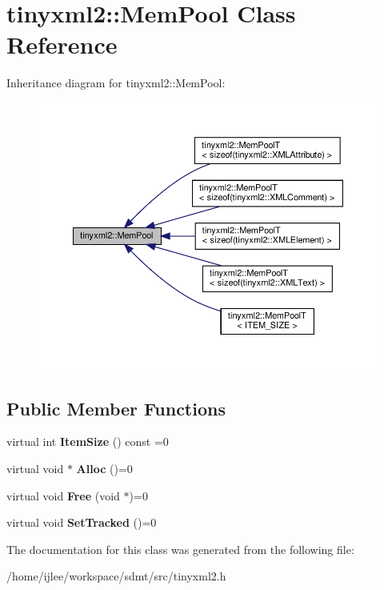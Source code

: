 \hypertarget{classtinyxml2_1_1_mem_pool}{}\section{tinyxml2\+:\+:Mem\+Pool Class Reference}
\label{classtinyxml2_1_1_mem_pool}


Inheritance diagram for tinyxml2\+:\+:Mem\+Pool\+:
\nopagebreak
\begin{figure}[H]
\begin{center}
\leavevmode
\includegraphics[width=350pt]{classtinyxml2_1_1_mem_pool__inherit__graph}
\end{center}
\end{figure}
\subsection*{Public Member Functions}
\begin{DoxyCompactItemize}
\item 
\mbox{\label{classtinyxml2_1_1_mem_pool_a0c518d49e3a94bde566f61e13b7240bb}} 
virtual int {\bfseries Item\+Size} () const =0
\item 
\mbox{\label{classtinyxml2_1_1_mem_pool_a4f977b5fed752c0bbfe5295f469d6449}} 
virtual void $\ast$ {\bfseries Alloc} ()=0
\item 
\mbox{\label{classtinyxml2_1_1_mem_pool_a49e3bfac2cba2ebd6776b31e571f64f7}} 
virtual void {\bfseries Free} (void $\ast$)=0
\item 
\mbox{\label{classtinyxml2_1_1_mem_pool_ac5804dd1387b2e4de5eef710076a0db1}} 
virtual void {\bfseries Set\+Tracked} ()=0
\end{DoxyCompactItemize}


The documentation for this class was generated from the following file\+:\begin{DoxyCompactItemize}
\item 
/home/ijlee/workspace/sdmt/src/tinyxml2.\+h\end{DoxyCompactItemize}
